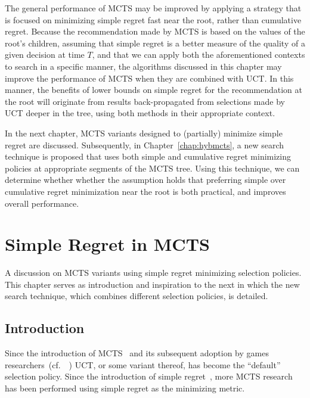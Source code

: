\documentclass{kecsmstr}
\newcommand{\cf}{{cf.}~}
\begin{document}
The general performance of MCTS may be improved by applying a strategy that is focused on minimizing simple regret fast near the root, rather than cumulative regret. Because the recommendation made by MCTS is based on the values of the root's children, assuming that simple regret is a better measure of the quality of a given decision at time $T$, and that we can apply both the aforementioned contexts to search in a specific manner, the algorithms discussed in this chapter may improve the performance of MCTS when they are combined with UCT. In this manner, the benefits of lower bounds on simple regret for the recommendation at the root will originate from results back-propagated from selections made by UCT deeper in the tree, using both methods in their appropriate context.

In the next chapter, MCTS variants designed to (partially) minimize simple regret are discussed. Subsequently, in Chapter~\ref{chap:hybmcts}, a new search technique is proposed that uses both simple and cumulative regret minimizing policies at appropriate segments of the MCTS tree. Using this technique, we can determine whether whether the assumption holds that preferring simple over cumulative regret minimization near the root is both practical, and improves overall performance.

\chapter{Simple Regret in MCTS}
\label{chap:mctssr}

\begin{chaptercontents} A discussion on MCTS variants using simple regret minimizing selection policies. This chapter serves as introduction and inspiration to the next in which the new search technique, which combines different selection policies, is detailed.
\end{chaptercontents}

\section{Introduction}
Since the introduction of MCTS~ and its subsequent adoption by games researchers~(\cf~) UCT, or some variant thereof, has become the ``default'' selection policy. Since the introduction of simple regret~, more MCTS research has been performed using simple regret as the minimizing metric.
\end{document}
